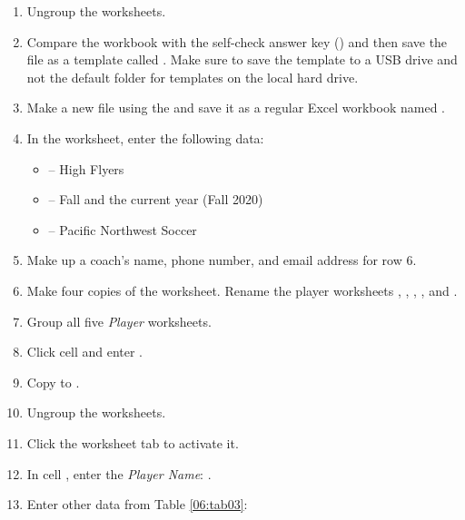 \begin{enumbox}
\begin{enumerate}
		\item Ungroup the worksheets.
		\item Compare the workbook with the self-check answer key () and then save the file as a template called . Make sure to save the  template to a USB drive and not the default folder for templates on the local hard drive.
		\item Make a new file using the  and save it as a regular Excel workbook named . 
		\item In the  worksheet, enter the following data:
		
		\begin{itemize}
			\item {} – High Flyers
			\item {} – Fall and the current year (\ie Fall 2020)
			\item {} – Pacific Northwest Soccer
		\end{itemize}
		
		\item Make up a coach's name, phone number, and email address for row $ 6 $.
		\item Make four copies of the  worksheet. Rename the player worksheets , , , , and .
		\item Group all five \textit{Player} worksheets.
		\item Click cell  and enter .
		\item Copy  to .
		\item Ungroup the worksheets.
		\item Click the  worksheet tab to activate it. 
		\item In cell , enter the \textit{Player Name}: . 
		\item Enter other data from Table \ref{06:tab03}:
	\end{enumerate}
\end{enumbox}
	
